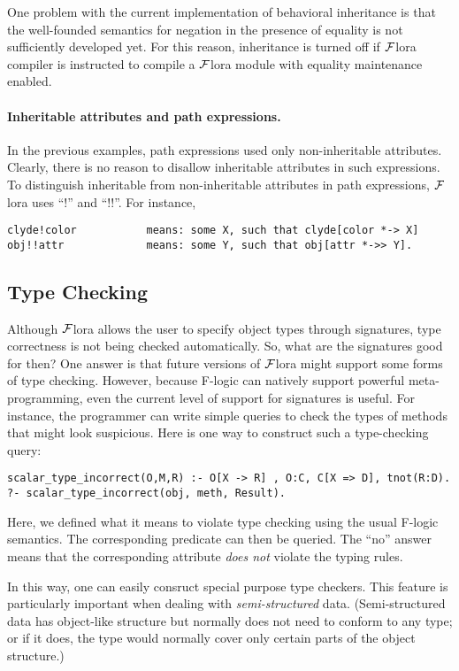 \documentclass[11pt]{article}
\newcommand{\FLORA}{{\mbox{${\cal F}${\sc lora}}}\xspace}
\begin{document}
One problem with the current implementation of behavioral inheritance is
that the well-founded semantics for negation in the presence of equality is
not sufficiently developed yet. For this reason, inheritance is turned off
if \FLORA compiler is instructed to compile a \FLORA module with equality
maintenance enabled.

\paragraph{Inheritable attributes and path expressions.}
In the previous examples, path expressions used only non-inheritable
attributes. Clearly, there is no reason to disallow inheritable attributes
in such expressions. To distinguish inheritable from non-inheritable
attributes in path expressions, \FLORA uses ``!'' and ``!!''. For instance, 
\begin{verbatim}
clyde!color           means: some X, such that clyde[color *-> X]
obj!!attr             means: some Y, such that obj[attr *->> Y].
\end{verbatim}

\subsection{Type Checking}

Although \FLORA allows the user to specify object types through signatures,
type correctness is not being checked automatically. So, what are the
signatures good for then? One answer is that future versions of \FLORA
might support some forms of type checking. However, because F-logic can
natively support powerful meta-programming, even the current level
of support for signatures is useful. For instance, the programmer can write
simple queries to check the types of methods that might look suspicious.
Here is one way to construct such a type-checking query:
\begin{verbatim}
scalar_type_incorrect(O,M,R) :- O[X -> R] , O:C, C[X => D], tnot(R:D).
?- scalar_type_incorrect(obj, meth, Result).
\end{verbatim}
Here, we defined what it means to violate type checking using the usual
F-logic semantics. The corresponding predicate can then be queried. The
``no'' answer means that the corresponding attribute \emph{does not}
violate the typing rules.

In this way, one can easily consruct special purpose type checkers.  This
feature is particularly important when dealing with \emph{semi-structured}
data. (Semi-structured data has object-like structure but normally does not
need to conform to any type; or if it does, the type would normally cover
only certain parts of the object structure.)
\end{document}
